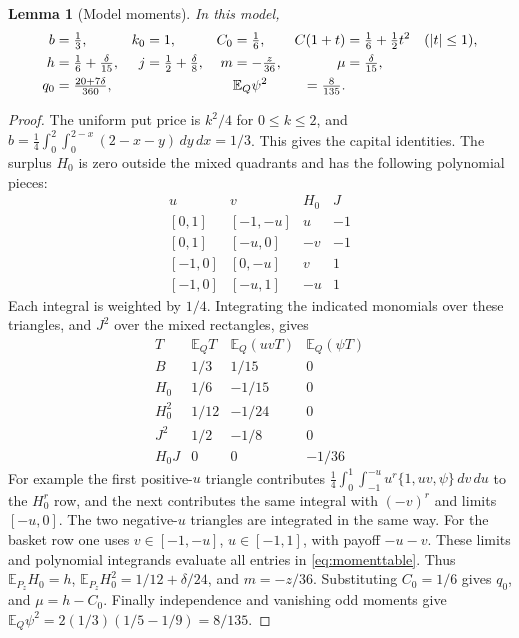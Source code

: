 \documentclass[11pt,a4paper]{amsart}
\theoremstyle{plain}
\newtheorem{lemma}[theorem]{Lemma}
\theoremstyle{definition}
\theoremstyle{remark}
\newcommand{\EE}{\mathbb{E}}
\begin{document}
\begin{lemma}[Model moments]\label{lem:moments}
In this model,
\begin{align}\label{eq:modelmoments}
 b&=\tfrac13, & k_0&=1, & C_0&=\tfrac16,
 & C(1+t)&=\tfrac16+\tfrac12t^2\quad(|t|\le1),\notag\\
 h&=\tfrac16+\tfrac\delta{15}, & j&=\tfrac12+\tfrac\delta8,
 & m&=-\tfrac z{36}, & \mu&=\tfrac\delta{15},\notag\\
 q_0&=\tfrac{20+7\delta}{360},&&&&
 \EE_Q\psi^2&=\tfrac8{135}.
\end{align}
\end{lemma}
\begin{proof}
The uniform put price is $k^2/4$ for $0\le k\le2$, and
$b=\frac14\int_0^2\int_0^{2-x}(2-x-y)\,dy\,dx=1/3$.
This gives the capital identities. The surplus $H_0$ is zero outside the mixed quadrants and has the following polynomial pieces:
\[
\begin{array}{c|c|c|c}
 u&v&H_0&J\\ \hline
 [0,1]&[-1,-u]&u&-1\\
 {[0,1]}&[-u,0]&-v&-1\\
 {[-1,0]}&[0,-u]&v&1\\
 {[-1,0]}&[-u,1]&-u&1
\end{array}
\]
Each integral is weighted by $1/4$. Integrating the indicated monomials over these triangles, and $J^2$ over the mixed rectangles, gives
\begin{equation}\label{eq:momenttable}
\begin{array}{c|rrr}
 T&\EE_QT&\EE_Q(uvT)&\EE_Q(\psi T)\\ \hline
 B&1/3&1/15&0\\
 H_0&1/6&-1/15&0\\
 H_0^2&1/12&-1/24&0\\
 J^2&1/2&-1/8&0\\
 H_0J&0&0&-1/36
\end{array}
\end{equation}
For example the first positive-$u$ triangle contributes
$\frac14\int_0^1\int_{-1}^{-u}u^r\{1,uv,\psi\}\,dv\,du$ to the $H_0^r$ row, and the next contributes the same integral with $(-v)^r$ and limits $[-u,0]$. The two negative-$u$ triangles are integrated in the same way. For the basket row one uses $v\in[-1,-u]$, $u\in[-1,1]$, with payoff $-u-v$. These limits and polynomial integrands evaluate all entries in \eqref{eq:momenttable}. Thus $\EE_{P_z}H_0=h$, $\EE_{P_z}H_0^2=1/12+\delta/24$, and $m=-z/36$. Substituting $C_0=1/6$ gives $q_0$, and $\mu=h-C_0$.
Finally independence and vanishing odd moments give
$\EE_Q\psi^2=2(1/3)(1/5-1/9)=8/135$.
\end{proof}
\end{document}
